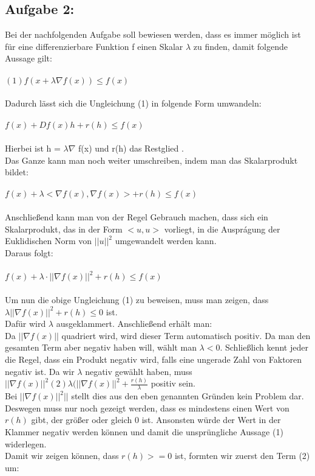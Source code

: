 \subsection{Aufgabe 2:}
Bei der nachfolgenden Aufgabe soll bewiesen werden, dass es immer möglich ist für eine differenzierbare Funktion f einen Skalar $\lambda$ zu finden, damit folgende Aussage gilt: \\ \\
$(1) f(x + \lambda \nabla f(x)) \leq f(x)$ \\ \\
Dadurch lässt sich die Ungleichung (1) in folgende Form umwandeln: \\ \\
$f(x) + Df(x)h + r(h) \leq f(x)$  \\ \\
Hierbei ist h = $\lambda \nabla$ f(x) und r(h) das Restglied %
. \\
Das Ganze kann man noch weiter umschreiben, indem man das Skalarprodukt bildet: \\ \\
$f(x) + \lambda <\nabla f(x), \nabla f(x)> + r(h) \leq f(x)$ \\ \\
Anschließend kann man von der Regel Gebrauch machen, dass sich ein Skalarprodukt, das in der Form $<u,u>$ vorliegt, in die Auspr\'agung der Euklidischen Norm von $||u||^2$ umgewandelt werden kann. \\
Daraus folgt: \\ \\
$f(x) + \lambda \cdot || \nabla f(x)||^2 + r(h) \leq f(x)$ \\ \\
Um nun die obige Ungleichung (1) zu beweisen, muss man zeigen, dass \\ $\lambda ||\nabla f(x)||^2 + r(h) \leq 0$ ist.\\
Dafür wird $\lambda$ ausgeklammert. Anschließend erhält man:\\
Da $||\nabla f(x)||$ quadriert wird, wird dieser Term automatisch positiv. Da man den gesamten Term aber negativ haben will, wählt man $\lambda < 0.$ Schließlich kennt jeder die Regel, dass ein Produkt negativ wird, falls eine ungerade Zahl von Faktoren negativ ist. Da wir $\lambda$ negativ gewählt haben, muss \\ $||\nabla f(x)||^2$$(2) \lambda (||\nabla f(x)||^2 + \frac{r(h)}{\lambda}$ positiv sein.\\
Bei $||\nabla f(x)||^2||$ stellt dies aus den eben genannten Gr\"unden kein Problem dar. Deswegen muss nur noch gezeigt werden, dass es mindestens einen Wert von $r(h)$ gibt, der gr\"oßer oder gleich 0 ist. Ansonsten würde der Wert in der Klammer negativ werden k\"onnen und damit die unspr\"ungliche Aussage (1) widerlegen.\\
Damit wir zeigen k\"onnen, dass $r(h) >= 0$ ist, formten wir zuerst den Term (2) um:\\

